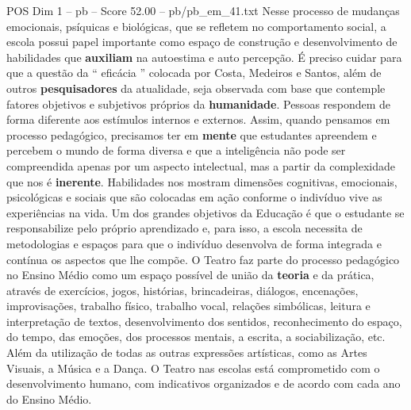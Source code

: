 \begin{textsample}{POS Dim 1 – pb – Score 52.00 – pb/pb\_em\_41.txt}
Nesse processo de mudanças emocionais, psíquicas e biológicas, que se refletem no comportamento social, a escola possui papel importante como espaço de construção e desenvolvimento de habilidades que \textbf{auxiliam} na autoestima e auto percepção.
É preciso cuidar para que a questão da “ eficácia ” colocada por Costa, Medeiros e Santos, além de outros \textbf{pesquisadores} da atualidade, seja observada com base que contemple fatores objetivos e subjetivos próprios da \textbf{humanidade}.
Pessoas respondem de forma diferente aos estímulos internos e externos.
Assim, quando pensamos em processo pedagógico, precisamos ter em \textbf{mente} que estudantes apreendem e percebem o mundo de forma diversa e que a inteligência não pode ser compreendida apenas por um aspecto intelectual, mas a partir da complexidade que nos é \textbf{inerente}.
Habilidades nos mostram dimensões cognitivas, emocionais, psicológicas e sociais que são colocadas em ação conforme o indivíduo vive as experiências na vida.
Um dos grandes objetivos da Educação é que o estudante se responsabilize pelo próprio aprendizado e, para isso, a escola necessita de metodologias e espaços para que o indivíduo desenvolva de forma integrada e contínua os aspectos que lhe compõe.
O Teatro faz parte do processo pedagógico no Ensino Médio como um espaço possível de união da \textbf{teoria} e da prática, através de exercícios, jogos, histórias, brincadeiras, diálogos, encenações, improvisações, trabalho físico, trabalho vocal, relações simbólicas, leitura e interpretação de textos, desenvolvimento dos sentidos, reconhecimento do espaço, do tempo, das emoções, dos processos mentais, a escrita, a sociabilização, etc.
Além da utilização de todas as outras expressões artísticas, como as Artes Visuais, a Música e a Dança.
O Teatro nas escolas está comprometido com o desenvolvimento humano, com indicativos organizados e de acordo com cada ano do Ensino Médio.

\end{textsample}
